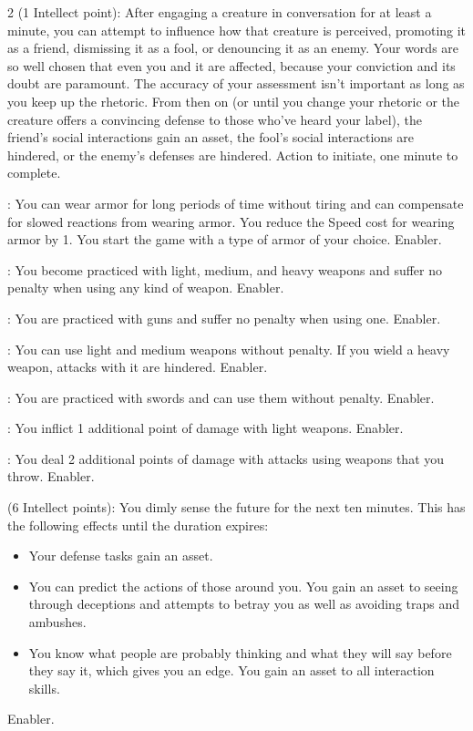 \begin{multicols}{2}
 (1 Intellect point): After engaging a creature in conversation for at least a minute, you can attempt to influence how that creature is perceived, promoting it as a friend, dismissing it as a fool, or denouncing it as an enemy. Your words are so well chosen that even you and it are affected, because your conviction and its doubt are paramount. The accuracy of your assessment isn’t important as long as you keep up the rhetoric. From then on (or until you change your rhetoric or the creature offers a convincing defense to those who’ve heard your label), the friend’s social interactions gain an asset, the fool’s social interactions are hindered, or the enemy’s defenses are hindered. Action to initiate, one minute to complete. 
 
: You can wear armor for long periods of time without tiring and can compensate for slowed reactions from wearing armor. You reduce the Speed cost for wearing armor by 1. You start the game with a type of armor of your choice. Enabler. 
 
: You become practiced with light, medium, and heavy weapons and suffer no penalty when using any kind of weapon. Enabler. 
 
: You are practiced with guns and suffer no penalty when using one. Enabler. 
 
: You can use light and medium weapons without penalty. If you wield a heavy weapon, attacks with it are hindered. Enabler. 
 
: You are practiced with swords and can use them without penalty. Enabler.
 
: You inflict 1 additional point of damage with light weapons. Enabler. 
 
: You deal 2 additional points of damage with attacks using weapons that you throw. Enabler. 
 
 (6 Intellect points): You dimly sense the future for the next ten minutes. This has the following effects until the duration expires: 

\begin{itemize} 
\item Your defense tasks gain an asset. 
\item You can predict the actions of those around you. You gain an asset to seeing through deceptions and attempts to betray you as well as avoiding traps and ambushes. 
\item You know what people are probably thinking and what they will say before they say it, which gives you an edge. You gain an asset to all interaction skills. 
\end{itemize}
Enabler. 
 

\end{multicols}

